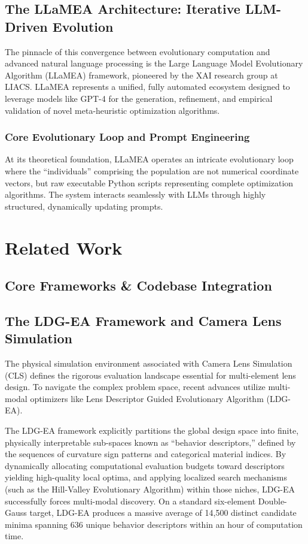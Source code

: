 \documentclass[12pt]{article}
\begin{document}
\subsection{The LLaMEA Architecture: Iterative LLM-Driven Evolution}

The pinnacle of this convergence between evolutionary computation and advanced natural language processing is the Large Language Model Evolutionary Algorithm (LLaMEA) framework, pioneered by the XAI research group at LIACS. LLaMEA represents a unified, fully automated ecosystem designed to leverage models like GPT-4 for the generation, refinement, and empirical validation of novel meta-heuristic optimization algorithms. 

\subsubsection{Core Evolutionary Loop and Prompt Engineering}
At its theoretical foundation, LLaMEA operates an intricate evolutionary loop where the ``individuals'' comprising the population are not numerical coordinate vectors, but raw executable Python scripts representing complete optimization algorithms. The system interacts seamlessly with LLMs through highly structured, dynamically updating prompts. 


\section{Related Work}\label{sec:relatedwork}

\subsection{Core Frameworks \& Codebase Integration}

\subsection{The LDG-EA Framework and Camera Lens Simulation}
The physical simulation environment associated with Camera Lens Simulation (CLS) defines the rigorous evaluation landscape essential for multi-element lens design. To navigate the complex problem space, recent advances utilize multi-modal optimizers like Lens Descriptor Guided Evolutionary Algorithm (LDG-EA).

The LDG-EA framework explicitly partitions the global design space into finite, physically interpretable sub-spaces known as ``behavior descriptors,'' defined by the sequences of curvature sign patterns and categorical material indices. By dynamically allocating computational evaluation budgets toward descriptors yielding high-quality local optima, and applying localized search mechanisms (such as the Hill-Valley Evolutionary Algorithm) within those niches, LDG-EA successfully forces multi-modal discovery. On a standard six-element Double-Gauss target, LDG-EA produces a massive average of 14,500 distinct candidate minima spanning 636 unique behavior descriptors within an hour of computation time.
\end{document}
